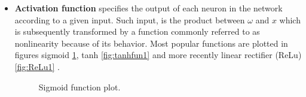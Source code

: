 \begin{itemize}
\item \textbf{Activation function} specifies the output of each neuron in the network according to a given input. Such input, is the product between $\omega$ and $x$ which is subsequently transformed by a function commonly referred to as nonlinearity because of its behavior. Most popular functions are plotted in figures  sigmoid \ref{fig:Sigfun1}, tanh \ref{fig:tanhfun1} and more recently linear rectifier (ReLu) \ref{fig:ReLu1} \cite{glorot2011deep}. 

\begin{figure}[!tb] 
\centering 
{}
\caption{Sigmoid function plot.}
\label{fig:Sigfun1} 
\end{figure}


\end{itemize}

